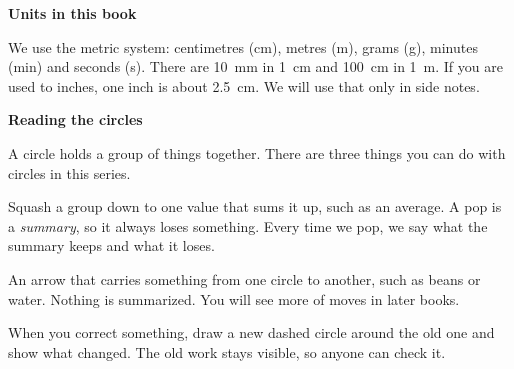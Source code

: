 {\sans\bfseries\large\color{sky!70!black} Units in this book}\par
We use the metric system: centimetres (cm), metres (m), grams (g), minutes (min) and seconds (s).
There are 10~mm in 1~cm and 100~cm in 1~m. If you are used to inches, one inch is about 2.5~cm. We will use that only in side notes.
\clearpage

\thispagestyle{plain}\label{circlecard}
{\sans\bfseries\LARGE\color{ink} Reading the circles}\par\vspace{0.1cm}
A circle holds a group of things together. There are three things you can do with circles in this series.

\begin{center}
\end{center}

\begin{description}[leftmargin=0pt,itemsep=0.4em,style=unboxed]
\item[\textcolor{tomato}{\sans\bfseries Pop}] Squash a group down to one value that sums it up, such as an average. A pop is a \emph{summary}, so it always loses something. Every time we pop, we say what the summary keeps and what it loses.
\item[\textcolor{sky!70!black}{\sans\bfseries Move}] An arrow that carries something from one circle to another, such as beans or water. Nothing is summarized. You will see more of moves in later books.
\item[\textcolor{tangerine!80!black}{\sans\bfseries Wrap}] When you correct something, draw a new dashed circle around the old one and show what changed. The old work stays visible, so anyone can check it.
\end{description}


